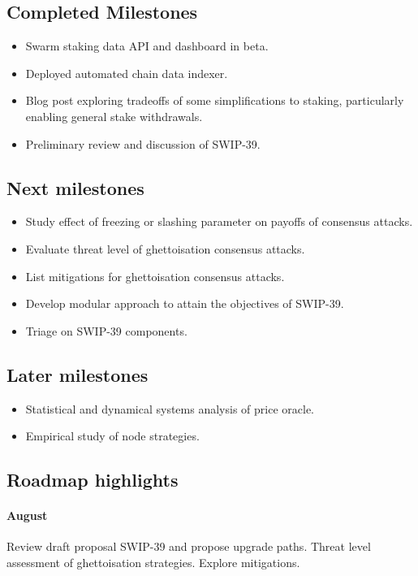 \subsection*{Completed Milestones}

\begin{itemize}
  \item 
    Swarm staking data API and dashboard in beta.
  \item
    Deployed automated chain data indexer.
  \item
    Blog post exploring tradeoffs of some simplifications to staking, particularly enabling general stake withdrawals.
  \item 
    Preliminary review and discussion of SWIP-39.

\end{itemize}

\subsection*{Next milestones}

\begin{itemize}
  \item Study effect of freezing or slashing parameter on payoffs of consensus attacks.
  \item Evaluate threat level of ghettoisation consensus attacks.
  \item List mitigations for ghettoisation consensus attacks.
  \item Develop modular approach to attain the objectives of SWIP-39.
  \item Triage on SWIP-39 components.
\end{itemize}

\subsection*{Later milestones}
\begin{itemize}
  \item Statistical and dynamical systems analysis of price oracle.
  \item Empirical study of node strategies.
\end{itemize}


\subsection*{Roadmap highlights}

\paragraph{August} 
%
Review draft proposal SWIP-39 and propose upgrade paths.
%
Threat level assessment of ghettoisation strategies.
%
Explore mitigations.

